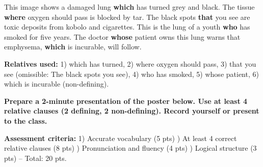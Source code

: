 \documentclass[11pt]{article}
\begin{document}
\begin{exemplebox}
\og This image shows a damaged lung \textbf{which} has turned grey and black. The tissue \textbf{where} oxygen should pass is blocked by tar. The black spots \textbf{that} you see are toxic deposits from kobolo and cigarettes. This is the lung of a youth \textbf{who} has smoked for five years. The doctor \textbf{whose} patient owns this lung warns that emphysema, \textbf{which} is incurable, will follow.\fg

\textbf{Relatives used:} 1) \og which has turned\fg, 2) \og where oxygen should pass\fg, 3) \og that you see\fg{} (omissible: \og The black spots you see\fg), 4) \og who has smoked\fg, 5) \og whose patient\fg, 6) \og which is incurable\fg{} (non-defining).
\end{exemplebox}

\begin{exercice}
\textbf{Prepare a 2-minute presentation of the poster below. Use at least 4 relative clauses (2 defining, 2 non-defining). Record yourself or present to the class.}

\begin{center}
\end{center}

\textbf{Assessment criteria:} 1) Accurate vocabulary (5 pts) ) At least 4 correct relative clauses (8 pts) ) Pronunciation and fluency (4 pts) ) Logical structure (3 pts) -- Total: 20 pts.
\end{exercice}
\end{document}
